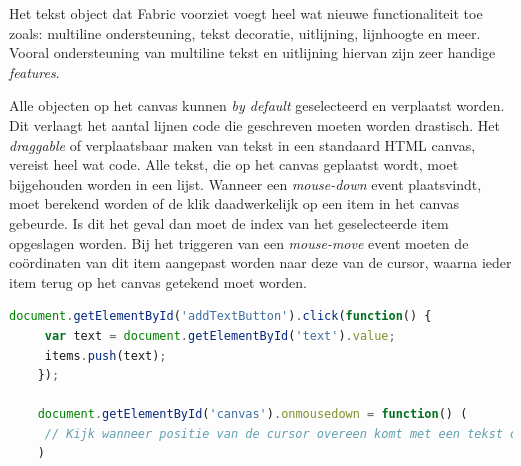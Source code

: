 Het tekst object dat Fabric voorziet voegt heel wat nieuwe functionaliteit toe zoals: multiline ondersteuning, tekst decoratie, uitlijning, lijnhoogte en meer. 
Vooral ondersteuning van multiline tekst en uitlijning hiervan zijn zeer handige \textit{features}.  %

Alle objecten op het canvas kunnen \textit{by default} geselecteerd en verplaatst worden. Dit verlaagt het aantal lijnen code die geschreven moeten worden drastisch. Het \textit{draggable} of verplaatsbaar maken van tekst in een standaard HTML canvas, vereist heel wat code. Alle tekst, die op het canvas geplaatst wordt, moet bijgehouden worden in een lijst. Wanneer een \textit{mouse-down} event plaatsvindt, moet berekend worden of de klik daadwerkelijk op een item in het canvas gebeurde. Is dit het geval dan moet de index van het geselecteerde item opgeslagen worden. Bij het triggeren van een \textit{mouse-move} event moeten de co\"{o}rdinaten van dit item aangepast worden naar deze van de cursor, waarna ieder item terug op het canvas getekend moet worden. 

\begin{lstlisting}[language=javascript]
	document.getElementById('addTextButton').click(function() {
	 var text = document.getElementById('text').value;
	 items.push(text);
	});
	
	document.getElementById('canvas').onmousedown = function() (
	 // Kijk wanneer positie van de cursor overeen komt met een tekst object
	)
\end{lstlisting}

